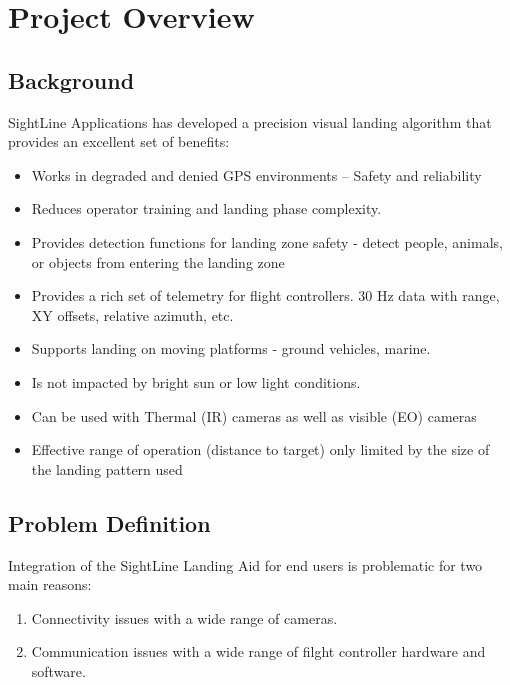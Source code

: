 \documentclass[11pt]{article}
\begin{document}
\pagebreak

\section{Project Overview}
\subsection{Background}
SightLine Applications has developed a precision visual landing algorithm that provides an excellent set of benefits:
\begin{itemize}
\item Works in degraded and denied GPS environments – Safety and reliability
\item	Reduces operator training and landing phase complexity.
\item	Provides detection functions for landing zone safety - detect people, animals, or objects from entering the landing zone
\item   Provides a rich set of telemetry for flight controllers.  30 Hz data with range, XY offsets, relative azimuth, etc.
\item	Supports landing on moving platforms - ground vehicles, marine.
\item	Is not impacted by bright sun or low light conditions.
\item	Can be used with Thermal (IR) cameras as well as visible (EO) cameras
\item	Effective range of operation (distance to target) only limited by the size of the landing pattern used
\end{itemize}

\subsection{Problem Definition}

Integration of the SightLine Landing Aid for end users is problematic for two main reasons: 

\begin{enumerate}
\item Connectivity issues with a wide range of cameras. 
\item Communication issues with a wide range of filght controller hardware and software.
\end{enumerate} 
\end{document}
